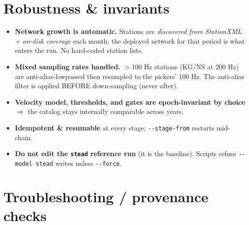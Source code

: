 \documentclass[11pt]{article}
\newcommand{\code}[1]{\texttt{#1}}
\begin{document}
\section{Robustness \& invariants}

\begin{itemize}[leftmargin=6mm,itemsep=1mm]
\item \textbf{Network growth is automatic.} Stations are \emph{discovered from StationXML + on-disk coverage}
each month; the deployed network for that period is what enters the run. No hard-coded station lists.
\item \textbf{Mixed sampling rates handled.} $>$100 Hz stations (KG/NS at 200 Hz) are anti-alias-lowpassed then
resampled to the pickers' 100 Hz. The anti-alias filter is applied BEFORE down-sampling (never after).
\item \textbf{Velocity model, thresholds, and gates are epoch-invariant by choice} $\Rightarrow$ the catalog stays
internally comparable across years.
\item \textbf{Idempotent \& resumable} at every stage; \code{-{}-stage-from} restarts mid-chain.
\item \textbf{Do not edit the \code{stead} reference run} (it is the baseline). Scripts refuse \code{-{}-model
stead} writes unless \code{-{}-force}.
\end{itemize}

\section{Troubleshooting / provenance checks}
\end{document}
